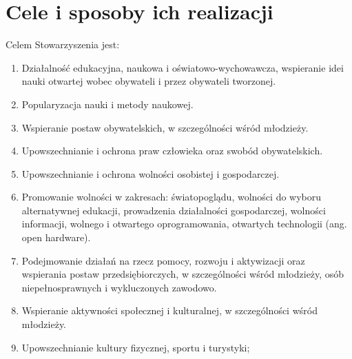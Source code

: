 \documentclass{article}
\begin{document}
\section{Cele i sposoby ich realizacji}
Celem Stowarzyszenia jest:
\begin{enumerate}
\item
  Działalność edukacyjna, naukowa i oświatowo-wychowawcza, wspieranie idei nauki otwartej wobec obywateli i przez obywateli tworzonej.
\item
  Popularyzacja nauki i metody naukowej.
\item
  Wspieranie postaw obywatelskich, w szczególności wśród młodzieży.
\item
  Upowszechnianie i ochrona praw człowieka oraz swobód obywatelskich.
\item
  Upowszechnianie i ochrona wolności osobistej i gospodarczej.
\item
  Promowanie wolności w zakresach: światopoglądu, wolności do wyboru alternatywnej edukacji, prowadzenia działalności gospodarczej,
  wolności informacji, wolnego i otwartego oprogramowania, otwartych technologii (ang. open hardware).
\item
  Podejmowanie działań na rzecz pomocy, rozwoju i aktywizacji oraz wspierania postaw przedsiębiorczych, w szczególności wśród młodzieży, osób niepełnosprawnych i wykluczonych zawodowo.
\item
  Wspieranie aktywności społecznej i kulturalnej, w szczególności wśród młodzieży.
\item
  Upowszechnianie kultury fizycznej, sportu i turystyki;
\end{enumerate}
\end{document}
